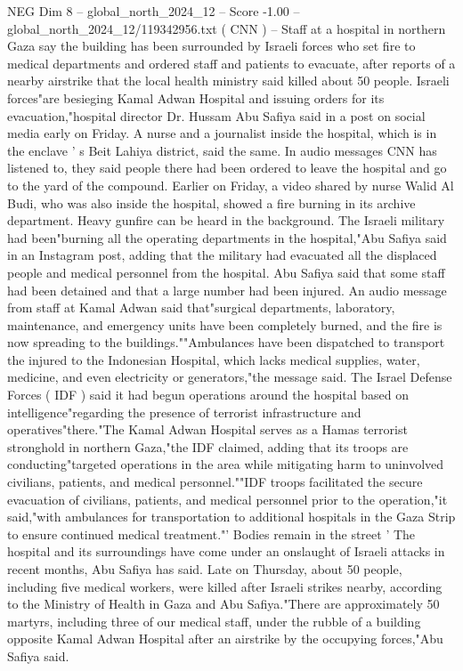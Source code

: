 \begin{textsample}{NEG Dim 8 – global\_north\_2024\_12 – Score -1.00 – global\_north\_2024\_12/119342956.txt}  \label{ex:f8_neg_113}
( CNN ) -- Staff at a hospital in northern Gaza say the building has been surrounded by Israeli forces who set fire to medical departments and ordered staff and patients to evacuate, after reports of a nearby airstrike that the local health ministry said killed about 50 people.
Israeli forces"are besieging Kamal Adwan Hospital and issuing orders for its evacuation,"hospital director Dr.
Hussam Abu Safiya said in a post on social media early on Friday.
A nurse and a journalist inside the hospital, which is in the enclave ' s Beit Lahiya district, said the same.
In audio messages CNN has listened to, they said people there had been ordered to leave the hospital and go to the yard of the compound.
Earlier on Friday, a video shared by nurse Walid Al Budi, who was also inside the hospital, showed a fire burning in its archive department.
Heavy gunfire can be heard in the background.
The Israeli military had been"burning all the operating departments in the hospital,"Abu Safiya said in an Instagram post, adding that the military had evacuated all the displaced people and medical personnel from the hospital.
Abu Safiya said that some staff had been detained and that a large number had been injured.
An audio message from staff at Kamal Adwan said that"surgical departments, laboratory, maintenance, and emergency units have been completely burned, and the fire is now spreading to the buildings.""Ambulances have been dispatched to transport the injured to the Indonesian Hospital, which lacks medical supplies, water, medicine, and even electricity or generators,"the message said.
The Israel Defense Forces ( IDF ) said it had begun operations around the hospital based on intelligence"regarding the presence of terrorist infrastructure and operatives"there."The Kamal Adwan Hospital serves as a Hamas terrorist stronghold in northern Gaza,"the IDF claimed, adding that its troops are conducting"targeted operations in the area while mitigating harm to uninvolved civilians, patients, and medical personnel.""IDF troops facilitated the secure evacuation of civilians, patients, and medical personnel prior to the operation,"it said,"with ambulances for transportation to additional hospitals in the Gaza Strip to ensure continued medical treatment."' Bodies remain in the street ' The hospital and its surroundings have come under an onslaught of Israeli attacks in recent months, Abu Safiya has said.
Late on Thursday, about 50 people, including five medical workers, were killed after Israeli strikes nearby, according to the Ministry of Health in Gaza and Abu Safiya."There are approximately 50 martyrs, including three of our medical staff, under the rubble of a building opposite Kamal Adwan Hospital after an airstrike by the occupying forces,"Abu Safiya said.

\end{textsample}
